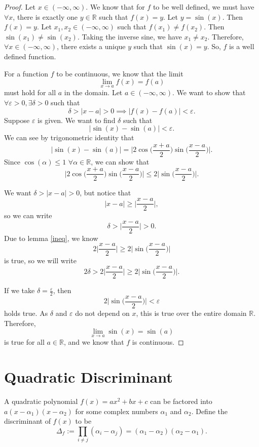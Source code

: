 \documentclass[12pt]{amsart}
\theoremstyle{case}
\begin{document}
	\begin{proof}
		Let $x \in (-\infty, \infty)$. We know that for $f$ to be well defined, we must have $\forall x$, there is exactly one $y \in \mathbb{R}$ such that $f(x) = y$. Let $y = \sin(x)$. Then $f(x) = y$. Let $x_1, x_2 \in (-\infty, \infty)$ such that $f(x_1) \neq f(x_2)$. Then $\sin(x_1) \neq \sin(x_2)$. Taking the inverse sine, we have $x_1 \neq x_2$. Therefore, $\forall x \in (-\infty, \infty)$, there exists a unique $y$ such that $\sin(x) = y$. So, $f$ is a well defined function.
		
		For a function $f$ to be continuous, we know that the limit
		$$\lim_{x \to a} f(x) = f(a)$$
		must hold for all $a$ in the domain. Let $a \in (-\infty, \infty)$. We want to show that $\forall \varepsilon > 0, \exists \delta > 0$ such that
		$$ \delta > |x-a| > 0 \implies |f(x) - f(a)| < \varepsilon. $$
		Suppose $\varepsilon$ is given. We want to find $\delta$ such that
		$$ |\sin(x) - \sin(a)| < \varepsilon. $$
		We can see by trigonometric identity that
		$$ |\sin(x) - \sin(a)| = \Big|2 \cos\Big(\frac{x+a}{2}\Big) \sin\Big(\frac{x-a}{2}\Big) \Big|. $$
		Since $\cos(\alpha) \leq 1$ $\forall \alpha \in \mathbb{R}$, we can show that
		$$ \Big|2 \cos\Big(\frac{x+a}{2}\Big) \sin\Big(\frac{x-a}{2}\Big) \Big| \leq 2 \Big| \sin\Big(\frac{x-a}{2}\Big)\Big|. $$
		
		
		We want $ \delta > |x-a| > 0$, but notice that $$|x-a| \geq \Big| \frac{x-a}{2} \Big|, $$
		so we can write
		$$ \delta > \Big| \frac{x-a}{2} \Big| > 0 .$$
		Due to lemma \ref{ineq}, we know
		$$ 2 \Big| \frac{x-a}{2} \Big| \geq 2 \Big| \sin\Big(\frac{x-a}{2}\Big)\Big| $$
		is true, so we will write
		$$ 2 \delta > 2 \Big| \frac{x-a}{2} \Big| \geq 2 \Big| \sin\Big(\frac{x-a}{2}\Big)\Big| . $$
		
		If we take $\delta = \frac{\varepsilon}{2}$, then
		$$ 2 \Big| \sin\Big(\frac{x-a}{2}\Big)\Big| < \varepsilon $$
		holds true. As $\delta$ and $\varepsilon$ do not depend on $x$, this is true over the entire domain $\mathbb{R}$. Therefore, 
		$$\lim_{x \to a} \sin(x) = \sin(a)$$
		is true for all $a \in \mathbb{R}$, and we know that $f$ is continuous.
	\end{proof}

	\section{Quadratic Discriminant}
	
	
	A quadratic polynomial $f(x) = ax^2 + bx + c$ can be factored into $a(x-\alpha_1)(x-\alpha_2)$ for some complex numbers $\alpha_1$ and $\alpha_2$. Define the discriminant of $f(x)$ to be
	$$ \Delta_f := \prod_{i\neq j} (\alpha_i - \alpha_j) = (\alpha_1 - \alpha_2)(\alpha_2 - \alpha_1) .$$	
	
\end{document}
